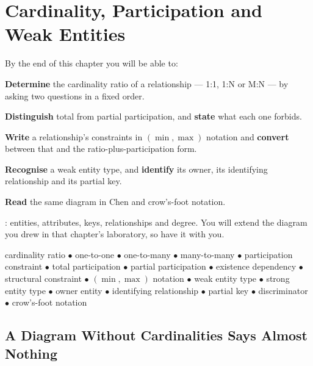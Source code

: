 \chapter{Cardinality, Participation and Weak Entities}\label{ch:cardinality}

\begin{outcomes}
By the end of this chapter you will be able to:
\begin{tight}
  \item \textbf{Determine} the cardinality ratio of a relationship --- 1:1,
        1:N or M:N --- by asking two questions in a fixed order.
  \item \textbf{Distinguish} total from partial participation, and
        \textbf{state} what each one forbids.
  \item \textbf{Write} a relationship's constraints in $(\min,\max)$ notation
        and \textbf{convert} between that and the ratio-plus-participation
        form.
  \item \textbf{Recognise} a weak entity type, and \textbf{identify} its owner,
        its identifying relationship and its partial key.
  \item \textbf{Read} the same diagram in Chen and crow's-foot notation.
\end{tight}
\end{outcomes}

\begin{prereq}
: entities, attributes, keys, relationships and degree. You
will extend the diagram you drew in that chapter's laboratory, so have it with
you.
\end{prereq}

\begin{keyterms}
cardinality ratio $\bullet$ one-to-one $\bullet$ one-to-many $\bullet$
many-to-many $\bullet$ participation constraint $\bullet$ total participation
$\bullet$ partial participation $\bullet$ existence dependency $\bullet$
structural constraint $\bullet$ $(\min,\max)$ notation $\bullet$ weak entity
type $\bullet$ strong entity type $\bullet$ owner entity $\bullet$ identifying
relationship $\bullet$ partial key $\bullet$ discriminator $\bullet$
crow's-foot notation
\end{keyterms}

\section{A Diagram Without Cardinalities Says Almost Nothing}

